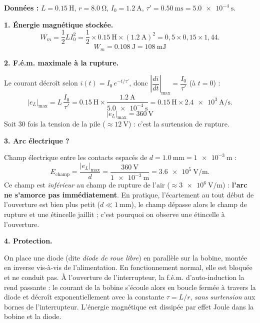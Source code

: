 \documentclass[11pt]{article}
\newcommand{\cle}[1]{{\popxbold\color{popdark}#1}}
\begin{document}
\begin{corrige}
\textbf{Données :} $L = \SI{0,15}{\henry}$, $r = \SI{8,0}{\ohm}$, $I_0 = \SI{1,2}{\ampere}$, $\tau' = \SI{0,50}{\milli\second} = \SI{5,0e-4}{\second}$.

\textbf{1. Énergie magnétique stockée.}
\[
W_m = \dfrac{1}{2}L I_0^2 = \dfrac{1}{2}\times \SI{0,15}{\henry}\times (\SI{1,2}{\ampere})^2 = 0,5\times 0,15\times 1,44.
\]
\[
\boxed{W_m = \SI{0,108}{\joule} = \SI{108}{\milli\joule}}
\]

\textbf{2. F.é.m. maximale à la rupture.}

Le courant décroît selon $i(t) = I_0\,e^{-t/\tau'}$, donc $\left|\dfrac{di}{dt}\right|_{\max} = \dfrac{I_0}{\tau'}$ (à $t = 0$) :
\[
|e_L|_{\max} = L\,\dfrac{I_0}{\tau'} = \SI{0,15}{\henry}\times\dfrac{\SI{1,2}{\ampere}}{\SI{5,0e-4}{\second}} = \SI{0,15}{\henry}\times \SI{2,4e3}{\ampere\per\second}.
\]
\[
\boxed{|e_L|_{\max} = \SI{360}{\volt}}
\]
Soit 30 fois la tension de la pile ($\approx \SI{12}{\volt}$) : c'est la \cle{surtension de rupture}.

\textbf{3. Arc électrique ?}

Champ électrique entre les contacts espacés de $d = \SI{1,0}{\milli\meter} = \SI{1e-3}{\meter}$ :
\[
E_{\text{champ}} = \dfrac{|e_L|_{\max}}{d} = \dfrac{\SI{360}{\volt}}{\SI{1e-3}{\meter}} = \SI{3,6e5}{\volt\per\meter}.
\]
Ce champ est \emph{inférieur} au champ de rupture de l'air ($\approx \SI{3e6}{\volt\per\meter}$) : \textbf{l'arc ne s'amorce pas immédiatement}. En pratique, l'écartement au tout début de l'ouverture est bien plus petit ($d \ll \SI{1}{\milli\meter}$), le champ dépasse alors le champ de rupture et une étincelle jaillit ; c'est pourquoi on observe une étincelle à l'ouverture.

\textbf{4. Protection.}

On place une \cle{diode} (dite \emph{diode de roue libre}) en parallèle sur la bobine, montée en inverse vis-à-vis de l'alimentation. En fonctionnement normal, elle est bloquée et ne conduit pas. À l'ouverture de l'interrupteur, la f.é.m. d'auto-induction la rend passante : le courant de la bobine s'écoule alors en boucle fermée à travers la diode et décroît exponentiellement avec la constante $\tau = L/r$, \emph{sans surtension} aux bornes de l'interrupteur. L'énergie magnétique est dissipée par effet Joule dans la bobine et la diode.
\end{corrige}
\end{document}
